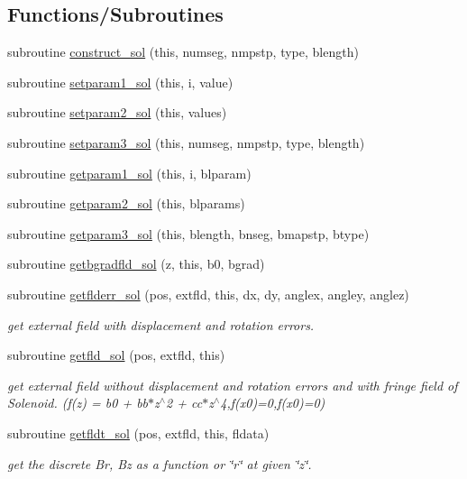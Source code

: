 \subsection*{Functions/\+Subroutines}
\begin{DoxyCompactItemize}
\item 
subroutine \mbox{\hyperlink{namespacesolclass_a2307b36cefac8604240e62757dd08cb9}{construct\+\_\+sol}} (this, numseg, nmpstp, type, blength)
\item 
subroutine \mbox{\hyperlink{namespacesolclass_aaec011d4f25d3b03a7e0b42beaa7c9db}{setparam1\+\_\+sol}} (this, i, value)
\item 
subroutine \mbox{\hyperlink{namespacesolclass_a8f2eac99c954759e1b3b6094d8f502fb}{setparam2\+\_\+sol}} (this, values)
\item 
subroutine \mbox{\hyperlink{namespacesolclass_a05dc05d4a94a2e1a71280ff983e62c3e}{setparam3\+\_\+sol}} (this, numseg, nmpstp, type, blength)
\item 
subroutine \mbox{\hyperlink{namespacesolclass_a68e03415e9802b36da3ec9bae72f41b7}{getparam1\+\_\+sol}} (this, i, blparam)
\item 
subroutine \mbox{\hyperlink{namespacesolclass_aab6c073c4b20670742987b17bcb8366d}{getparam2\+\_\+sol}} (this, blparams)
\item 
subroutine \mbox{\hyperlink{namespacesolclass_a11962a787b8bed31dd906ac4a5e2853e}{getparam3\+\_\+sol}} (this, blength, bnseg, bmapstp, btype)
\item 
subroutine \mbox{\hyperlink{namespacesolclass_ad89ee3db004c00d4f2e128ddbf03ce32}{getbgradfld\+\_\+sol}} (z, this, b0, bgrad)
\item 
subroutine \mbox{\hyperlink{namespacesolclass_a571ab7b6c8ce4dd9e7eaa2489b874682}{getflderr\+\_\+sol}} (pos, extfld, this, dx, dy, anglex, angley, anglez)
\begin{DoxyCompactList}\small\item\em get external field with displacement and rotation errors. \end{DoxyCompactList}\item 
subroutine \mbox{\hyperlink{namespacesolclass_a7a865f7ab4470f9bff328ed98aacd7c8}{getfld\+\_\+sol}} (pos, extfld, this)
\begin{DoxyCompactList}\small\item\em get external field without displacement and rotation errors and with fringe field of Solenoid. (f(z) = b0 + bb$\ast$z$^\wedge$2 + cc$\ast$z$^\wedge$4,f(x0)=0,f\textquotesingle{}(x0)=0) \end{DoxyCompactList}\item 
subroutine \mbox{\hyperlink{namespacesolclass_ae8d2c14b13bdf023c1a9efb101b4c666}{getfldt\+\_\+sol}} (pos, extfld, this, fldata)
\begin{DoxyCompactList}\small\item\em get the discrete Br, Bz as a function or \char`\"{}r\char`\"{} at given \char`\"{}z\char`\"{}. \end{DoxyCompactList}\end{DoxyCompactItemize}
